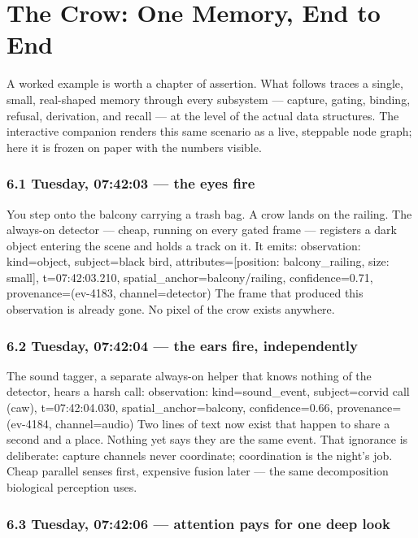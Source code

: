 \chapter{The Crow: One Memory, End to End}\label{the-crow-one-memory-end-to-end}

A worked example is worth a chapter of assertion. What follows traces a single, small, real-shaped memory through every subsystem --- capture, gating, binding, refusal, derivation, and recall --- at the level of the actual data structures. The interactive companion renders this same scenario as a live, steppable node graph; here it is frozen on paper with the numbers visible.

\subsection{6.1 Tuesday, 07:42:03 --- the eyes fire}\label{tuesday-074203-the-eyes-fire}

You step onto the balcony carrying a trash bag. A crow lands on the railing. The always-on detector --- cheap, running on every gated frame --- registers a dark object entering the scene and holds a track on it. It emits: observation: kind=object, subject=black bird, attributes={[}position: balcony\_railing, size: small{]}, t=07:42:03.210, spatial\_anchor=balcony/railing, confidence=0.71, provenance=(ev-4183, channel=detector) The frame that produced this observation is already gone. No pixel of the crow exists anywhere.

\subsection{6.2 Tuesday, 07:42:04 --- the ears fire, independently}\label{tuesday-074204-the-ears-fire-independently}

The sound tagger, a separate always-on helper that knows nothing of the detector, hears a harsh call: observation: kind=sound\_event, subject=corvid call (caw), t=07:42:04.030, spatial\_anchor=balcony, confidence=0.66, provenance=(ev-4184, channel=audio) Two lines of text now exist that happen to share a second and a place. Nothing yet says they are the same event. That ignorance is deliberate: capture channels never coordinate; coordination is the night's job. Cheap parallel senses first, expensive fusion later --- the same decomposition biological perception uses.

\subsection{6.3 Tuesday, 07:42:06 --- attention pays for one deep look}\label{tuesday-074206-attention-pays-for-one-deep-look}

